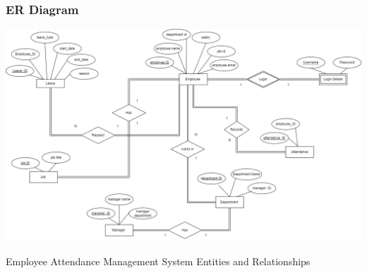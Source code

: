 \documentclass[a4paper, 12pt]{article}
\begin{document}
\subsubsection{ER Diagram}
\begin{center}
\includegraphics[width=1\textwidth]{Entity_Relation_Diagram.png}\par
\end{center}
Employee Attendance Management System Entities and Relationships
\end{document}
